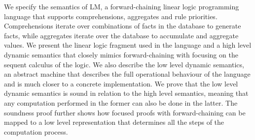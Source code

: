 We specify the semantics of LM, a forward-chaining linear logic programming
language that supports comprehensions, aggregates and rule priorities.
Comprehensions iterate over combinations of facts in the database to generate
facts, while aggregates iterate over the database to accumulate and aggregate
values. We present the linear logic fragment used in the language and a high
level dynamic semantics that closely mimics forward-chaining with focusing on
the sequent calculus of the logic. We also describe the low level dynamic
semantics, an abstract machine that describes the full operational behaviour of
the language and is much closer to a concrete implementation. We prove that the
low level dynamic semantics is sound in relation to the high level semantics,
meaning that any computation performed in the former can also be done in the
latter.  The soundness proof further shows how focused proofs with
forward-chaining can be mapped to a low level representation that determines all
the steps of the computation process.
